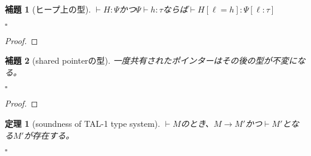 \documentclass[a4paper,oneside]{ltjsarticle}
\newtheorem{lemmax}{補題}
\newenvironment{lemma}%
{\begin{lemmax}}
{\end{lemmax}\hfill\ensuremath{\square}}
\newtheorem{theorem}{定理}
\begin{document}
\begin{lemma}[ヒープ上の型]\label{lemma:1}
    $\vdash H:\Psi$かつ$\Psi\vdash h:\tau$ならば$\vdash H[\ell=h]:\Psi[\ell:\tau]$
\end{lemma}
\begin{proof}
\end{proof}
\begin{lemma}[shared pointerの型]\label{lemma:2}
    一度共有されたポインターはその後の型が不変になる。
\end{lemma}
\begin{proof}
\end{proof}
\begin{theorem}[soundness of TAL-1 type system]\label{theorem:1}
    $\vdash M$のとき、$M\rightarrow M'$かつ$\vdash M'$となる$M'$が存在する。
\end{theorem}\hfill\ensuremath{\square}
\end{document}
